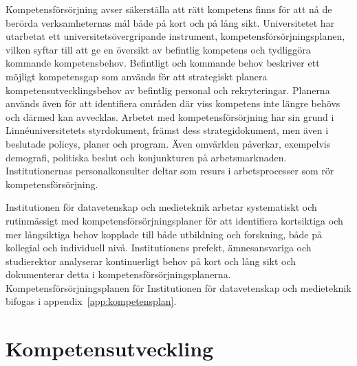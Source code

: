 Kompetensförsörjning avser säkerställa att rätt kompetens finns för att nå de berörda verksamheternas mål både på kort och på lång sikt. Universitetet har utarbetat ett universitetsövergripande instrument, kompetensförsörjningsplanen, vilken syftar till att ge en översikt av befintlig kompetens och tydliggöra kommande kompetensbehov. Befintligt och kommande behov beskriver ett möjligt kompetensgap som används för att strategiskt planera kompetensutvecklingsbehov av befintlig personal och rekryteringar. Planerna används även för att identifiera områden där viss kompetens inte längre behövs och därmed kan avvecklas. Arbetet med kompetensförsörjning har sin grund i Linnéuniversitetets styrdokument, främst dess strategidokument, men även i beslutade policys, planer och program. Även omvärlden påverkar, exempelvis demografi, politiska beslut och konjunkturen på arbetsmarknaden. Institutionernas personalkonsulter deltar som resurs i arbetsprocesser som rör kompetensförsörjning.

Institutionen för datavetenskap och medieteknik arbetar systematiskt och rutinmässigt med kompetensförsörjningsplaner för att identifiera kortsiktiga och mer långsiktiga behov kopplade till både utbildning och forskning, både på kollegial och individuell nivå. Institutionens prefekt, ämnesansvariga och studierektor analyserar kontinuerligt behov på kort och lång sikt och dokumenterar detta i kompetensförsörjningsplanerna. Kompetensförsörjningsplanen för Institutionen för datavetenskap och medieteknik bifogas i appendix~\ref{app:kompetensplan}.

\section{Kompetensutveckling}

